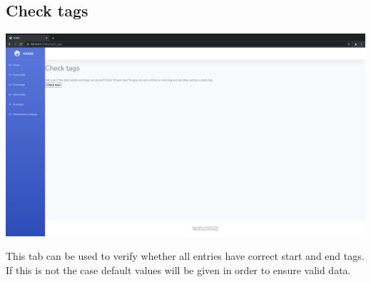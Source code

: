 \documentclass[12pt]{article}
\begin{document}
\subsection{Check tags}
\begin{center}
	\includegraphics[width=\linewidth]{images/Check_tags.png}
\end{center}
This tab can be used to verify whether all entries have correct start and end tags. If this is not the case default values will be given in order to ensure valid data.

\end{document}
